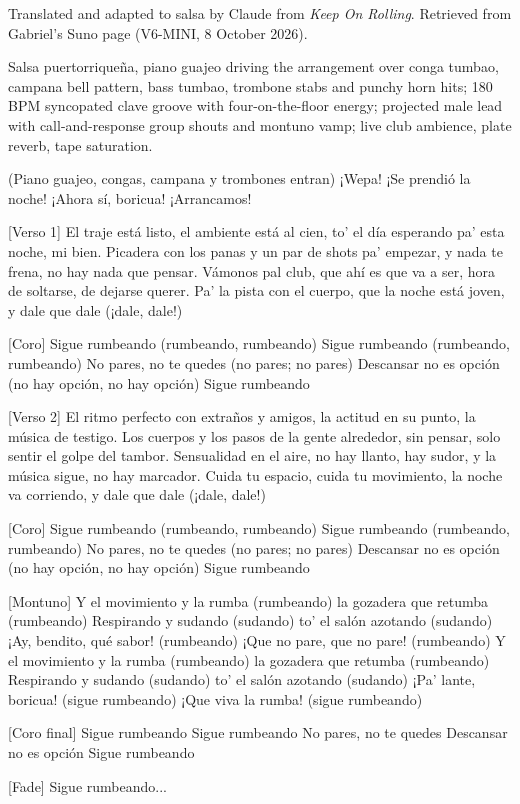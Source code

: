 \begin{notes}
Translated and adapted to salsa by Claude from \emph{Keep On Rolling}. Retrieved from Gabriel's Suno page (V6-MINI, 8 October 2026).
\end{notes}
\begin{style}
Salsa puertorriqueña, piano guajeo driving the arrangement over conga tumbao, campana bell pattern, bass tumbao, trombone stabs and punchy horn hits; 180 BPM syncopated clave groove with four-on-the-floor energy; projected male lead with call-and-response group shouts and montuno vamp; live club ambience, plate reverb, tape saturation.
\end{style}
\begin{lyrics}
[Intro]
(Piano guajeo, congas, campana y trombones entran)
¡Wepa! ¡Se prendió la noche!
¡Ahora sí, boricua! ¡Arrancamos!

[Verso 1]
El traje está listo, el ambiente está al cien,
to' el día esperando pa' esta noche, mi bien.
Picadera con los panas y un par de shots pa' empezar,
y nada te frena, no hay nada que pensar.
Vámonos pal club, que ahí es que va a ser,
hora de soltarse, de dejarse querer.
Pa' la pista con el cuerpo, que la noche está joven,
y dale que dale (¡dale, dale!)

[Coro]
Sigue rumbeando (rumbeando, rumbeando)
Sigue rumbeando (rumbeando, rumbeando)
No pares, no te quedes (no pares; no pares)
Descansar no es opción (no hay opción, no hay opción)
Sigue rumbeando

[Verso 2]
El ritmo perfecto con extraños y amigos,
la actitud en su punto, la música de testigo.
Los cuerpos y los pasos de la gente alrededor,
sin pensar, solo sentir el golpe del tambor.
Sensualidad en el aire, no hay llanto, hay sudor,
y la música sigue, no hay marcador.
Cuida tu espacio, cuida tu movimiento,
la noche va corriendo, y dale que dale (¡dale, dale!)

[Coro]
Sigue rumbeando (rumbeando, rumbeando)
Sigue rumbeando (rumbeando, rumbeando)
No pares, no te quedes (no pares; no pares)
Descansar no es opción (no hay opción, no hay opción)
Sigue rumbeando

[Montuno]
Y el movimiento y la rumba (rumbeando)
la gozadera que retumba (rumbeando)
Respirando y sudando (sudando)
to' el salón azotando (sudando)
¡Ay, bendito, qué sabor! (rumbeando)
¡Que no pare, que no pare! (rumbeando)
Y el movimiento y la rumba (rumbeando)
la gozadera que retumba (rumbeando)
Respirando y sudando (sudando)
to' el salón azotando (sudando)
¡Pa' lante, boricua! (sigue rumbeando)
¡Que viva la rumba! (sigue rumbeando)

[Coro final]
Sigue rumbeando
Sigue rumbeando
No pares,
no te quedes
Descansar no es opción
Sigue rumbeando

[Fade]
Sigue rumbeando...
\end{lyrics}

